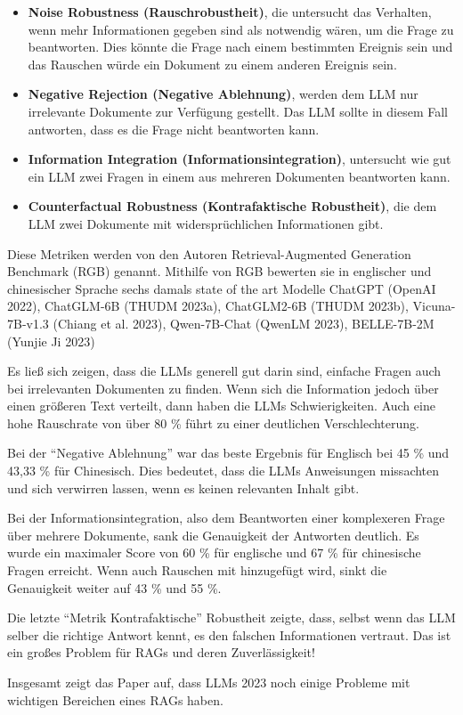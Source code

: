 \begin{itemize}
    \item \textbf{Noise Robustness (Rauschrobustheit)}, die untersucht das Verhalten, wenn mehr Informationen gegeben sind als notwendig wären, um die Frage zu beantworten.
                                                       Dies könnte die Frage nach einem bestimmten Ereignis sein und das Rauschen würde ein Dokument zu einem anderen Ereignis sein.

    \item \textbf{Negative Rejection (Negative Ablehnung)}, werden dem LLM nur irrelevante Dokumente zur Verfügung gestellt. Das LLM sollte in diesem Fall antworten, dass es die Frage nicht beantworten kann.

    \item \textbf{Information Integration (Informationsintegration)}, untersucht wie gut ein LLM zwei Fragen in einem aus mehreren Dokumenten beantworten kann.

    \item \textbf{Counterfactual Robustness (Kontrafaktische Robustheit)}, die dem LLM zwei Dokumente mit widersprüchlichen Informationen gibt.

\end{itemize}

Diese Metriken werden von den Autoren Retrieval-Augmented Generation Benchmark (RGB) genannt.
Mithilfe von RGB bewerten sie in englischer und chinesischer Sprache sechs damals state of the art Modelle ChatGPT (OpenAI 2022), ChatGLM-6B (THUDM 2023a), ChatGLM2-6B (THUDM 2023b), Vicuna-7B-v1.3 (Chiang et al. 2023), Qwen-7B-Chat (QwenLM 2023), BELLE-7B-2M (Yunjie Ji 2023)

Es ließ sich zeigen, dass die LLMs generell gut darin sind, einfache Fragen auch bei irrelevanten Dokumenten zu finden.
Wenn sich die Information jedoch über einen größeren Text verteilt, dann haben die LLMs Schwierigkeiten.
Auch eine hohe Rauschrate von über 80 \% führt zu einer deutlichen Verschlechterung.

Bei der \enquote{Negative Ablehnung} war das beste Ergebnis für Englisch bei 45 \% und 43,33 \% für Chinesisch. Dies bedeutet, dass die LLMs Anweisungen missachten und sich verwirren lassen, wenn es keinen relevanten Inhalt gibt.

Bei der Informationsintegration, also dem Beantworten einer komplexeren Frage über mehrere Dokumente, sank die Genauigkeit der Antworten deutlich.
Es wurde ein maximaler Score von 60 \% für englische und 67 \% für chinesische Fragen erreicht. Wenn auch Rauschen mit hinzugefügt wird, sinkt die Genauigkeit weiter auf 43 \% und 55 \%.

Die letzte \enquote{Metrik Kontrafaktische} Robustheit zeigte, dass, selbst wenn das LLM selber die richtige Antwort kennt, es den falschen Informationen vertraut. Das ist ein großes Problem für RAGs und deren Zuverlässigkeit!

Insgesamt zeigt das Paper auf, dass LLMs 2023 noch einige Probleme mit wichtigen Bereichen eines RAGs haben.